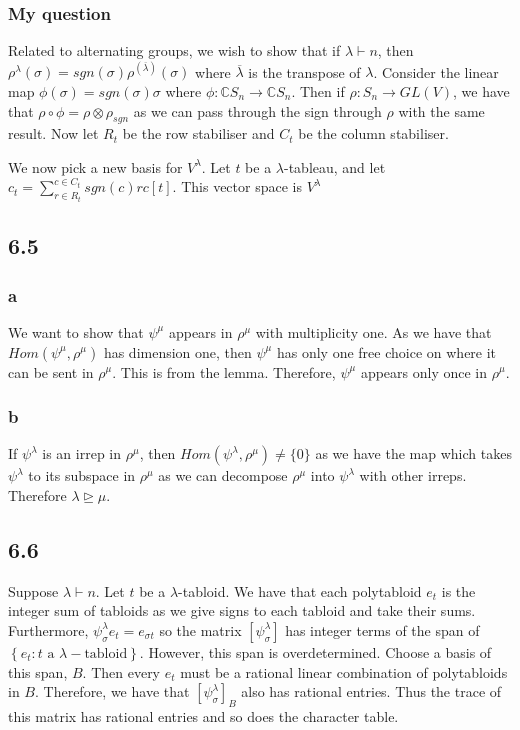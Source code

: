 \documentclass[]{article}
\begin{document}
\subsubsection*{My question}
Related to alternating groups, we wish to show that if $\lambda \vdash n$, then $\rho^\lambda(\sigma) = sgn(\sigma) \rho^{(\overline{\lambda})}(\sigma)$ where $\overline{\lambda}$ is the transpose of $\lambda$.
Consider the linear map $\phi(\sigma) = sgn(\sigma) \sigma$ where $\phi : \mathbb{C}S_n \rightarrow \mathbb{C} S_n$. Then if $\rho : S_n \rightarrow GL(V)$, we have that $\rho \circ \phi = \rho \otimes \rho_{sgn}$ as we can pass through the sign through $\rho$ with the same result.
Now let $R_t$ be the row stabiliser and $C_t$ be the column stabiliser. 

We now pick a new basis for $V^\lambda$. Let $t$ be a $\lambda$-tableau, and let $c_t = \sum_{r \in R_t}^{c \in C_t} sgn(c) r c[t]$. This vector space is $V^\lambda$ 

\subsection*{6.5}
\subsubsection*{a}
We want to show that $\psi^\mu$ appears in $\rho^\mu$ with multiplicity one. As we have that $Hom(\psi^\mu, \rho^\mu)$ has dimension one, then $\psi^\mu$ has only one free choice on where it can be sent in $\rho^\mu$. This is from the lemma. Therefore, $\psi^\mu$ appears only once in $\rho^\mu$. 

\subsubsection*{b}
If $\psi^\lambda$ is an irrep in $\rho^\mu$, then $Hom(\psi^\lambda, \rho^\mu) \neq \{ 0 \}$ as we have the map which takes $\psi^\lambda$ to its subspace in $\rho^\mu$ as we can decompose $\rho^\mu$ into $\psi^\lambda$ with other irreps. Therefore $\lambda \unrhd  \mu$. 

\subsection*{6.6}
Suppose $\lambda \vdash n$. Let $t$ be a $\lambda$-tabloid.
We have that each polytabloid $e_t$ is the integer sum of tabloids as we give signs to each tabloid and take their sums. Furthermore, $\psi^\lambda_\sigma e_t = e_{\sigma t}$ so the matrix $\left[\psi^\lambda_\sigma\right]$ has integer terms of the span of $\left\{ e_{t}: t \text{ a } \lambda- \text{tabloid}\right\}$. However, this span is overdetermined. Choose a basis of this span, $B$. Then every $e_t$ must be a rational linear combination of polytabloids in $B$. Therefore, we have that $\left[\psi^\lambda_\sigma\right]_B$ also has rational entries. Thus the trace of this matrix has rational entries and so does the character table. 
\end{document}
